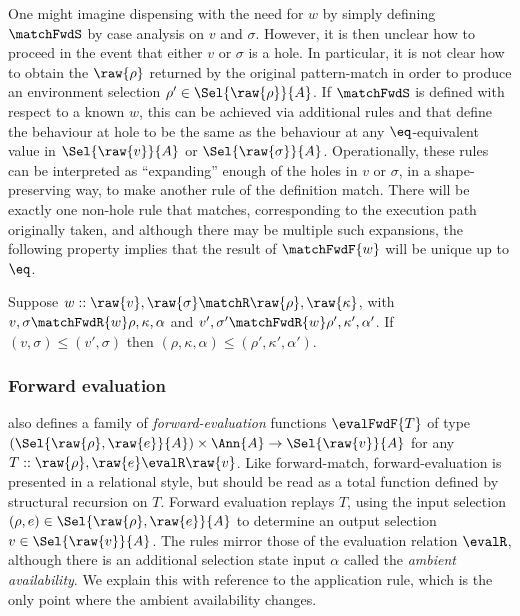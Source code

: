 One might imagine dispensing with the need for $w$ by simply defining $\matchFwdS$ by case analysis on $v$ and $\sigma$. However, it is then unclear how to proceed in the event that either $v$ or $\sigma$ is a hole. In particular, it is not clear how to obtain the $\raw{\rho}$ returned by the original pattern-match in order to produce an environment selection $\rho' \in \Sel{\raw{\rho}}{A}$. If $\matchFwdS$ is defined with respect to a known $w$, this can be achieved via additional rules  and  that define the behaviour at hole to be the same as the behaviour at any $\eq$-equivalent value in $\Sel{\raw{v}}{A}$ or $\Sel{\raw{\sigma}}{A}$. Operationally, these rules can be interpreted as ``expanding'' enough of the holes in $v$ or $\sigma$, in a shape-preserving way, to make another rule of the definition match. There will be exactly one non-hole rule that matches, corresponding to the execution path originally taken, and although there may be multiple such expansions, the following property implies that the result of $\matchFwdF{w}$ will be unique up to $\eq$.

\begin{lemma}
   Suppose $w :: \raw{v}, \raw{\sigma} \matchR \raw{\rho}, \raw{\kappa}$, with $v, \sigma \matchFwdR{w} \rho, \kappa, \alpha$ and $v', \sigma' \matchFwdR{w} \rho', \kappa', \alpha'$. If $(v, \sigma) \leq (v', \sigma)$ then $(\rho, \kappa, \alpha) \leq (\rho', \kappa', \alpha')$.
\end{lemma}

\subsubsection{Forward evaluation}
\label{sec:data-dependencies:forward-eval}

 also defines a family of \emph{forward-evaluation} functions $\evalFwdF{T}$ of type $(\Sel{\raw{\rho}, \raw{e}}{A}) \times \Ann{A} \to \Sel{\raw{v}}{A}$ for any $T :: \raw{\rho}, \raw{e} \evalR \raw{v}$. Like forward-match, forward-evaluation is presented in a relational style, but should be read as a total function defined by structural recursion on $T$. Forward evaluation replays $T$, using the input selection $(\rho, e) \in \Sel{\raw{\rho}, \raw{e}}{A}$ to determine an output selection $v \in \Sel{\raw{v}}{A}$. The rules mirror those of the evaluation relation $\evalR$, although there is an additional selection state input $\alpha$ called the \emph{ambient availability}. We explain this with reference to the application rule, which is the only point where the ambient availability changes.

